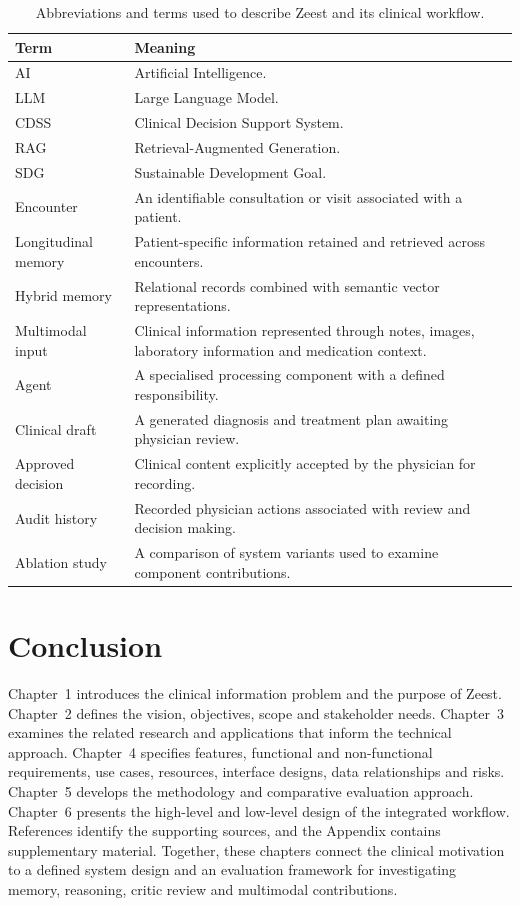 \begin{table}[htbp]
\centering
\small
\caption{Abbreviations and terms used to describe Zeest and its clinical workflow.}
\label{tab:kashaf:terms}
\begin{tabular}{|p{}|p{}|}
\hline
Term & Meaning \\ \hline
AI & Artificial Intelligence. \\ \hline
LLM & Large Language Model. \\ \hline
CDSS & Clinical Decision Support System. \\ \hline
RAG & Retrieval-Augmented Generation. \\ \hline
SDG & Sustainable Development Goal. \\ \hline
Encounter & An identifiable consultation or visit associated with a patient. \\ \hline
Longitudinal memory & Patient-specific information retained and retrieved across encounters. \\ \hline
Hybrid memory & Relational records combined with semantic vector representations. \\ \hline
Multimodal input & Clinical information represented through notes, images, laboratory information and medication context. \\ \hline
Agent & A specialised processing component with a defined responsibility. \\ \hline
Clinical draft & A generated diagnosis and treatment plan awaiting physician review. \\ \hline
Approved decision & Clinical content explicitly accepted by the physician for recording. \\ \hline
Audit history & Recorded physician actions associated with review and decision making. \\ \hline
Ablation study & A comparison of system variants used to examine component contributions. \\ \hline
\end{tabular}
\end{table}

\clearpage
\section{Conclusion}

Chapter~1 introduces the clinical information problem and the purpose of Zeest. Chapter~2 defines the vision, objectives, scope and stakeholder needs. Chapter~3 examines the related research and applications that inform the technical approach. Chapter~4 specifies features, functional and non-functional requirements, use cases, resources, interface designs, data relationships and risks. Chapter~5 develops the methodology and comparative evaluation approach. Chapter~6 presents the high-level and low-level design of the integrated workflow. References identify the supporting sources, and the Appendix contains supplementary material. Together, these chapters connect the clinical motivation to a defined system design and an evaluation framework for investigating memory, reasoning, critic review and multimodal contributions.

\endgroup
